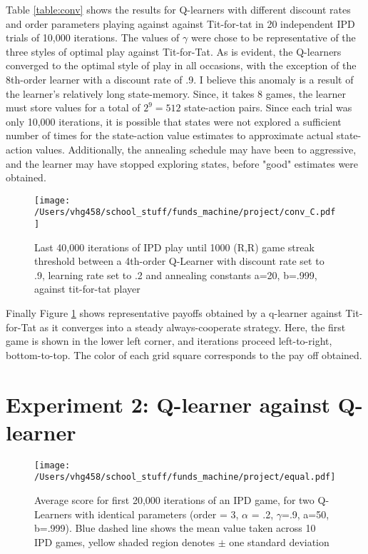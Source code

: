 \documentclass[12pt]{amsart}
\newcommand{\0}{\mat{0}}
\newcommand{\1}{\mathds{1}}
\begin{document}
Table \ref{table:conv} shows the results for Q-learners with different discount rates and order parameters playing against against Tit-for-tat in 20 independent IPD trials of 10,000 iterations.  The values of $\gamma$ were chose to be representative of the three styles of optimal play against Tit-for-Tat.  As is evident, the Q-learners converged to the optimal style of play in all occasions, with the exception of the 8th-order learner with a discount rate of .9.  I believe this anomaly is a result of the learner's relatively long state-memory.  Since, it takes 8 games, the learner must store values for a total of $2^9 = 512$ state-action pairs.  Since each trial was only 10,000 iterations, it is possible that states were not explored a sufficient number of times for the state-action value estimates to approximate actual state-action values.  Additionally, the annealing schedule may have been to aggressive, and the learner may have stopped exploring states, before "good" estimates were obtained.

  \begin{figure}
    \texttt{[image: /Users/vhg458/school\_stuff/funds\_machine/project/conv\_C.pdf]}
      \centering
        \caption{Last 40,000 iterations of IPD play until 1000 (R,R) game streak threshold between a 4th-order Q-Learner with discount rate set to .9, learning rate set to .2 and annealing constants a=20, b=.999, against tit-for-tat player  
}
  	\label{fig:heat_conv}
    \end{figure}

Finally Figure \ref{fig:heat_conv} shows representative payoffs obtained by a q-learner against Tit-for-Tat as it converges into a steady always-cooperate strategy.  Here, the first game is shown in the lower left corner, and iterations proceed left-to-right, bottom-to-top.  The color of each grid square corresponds to the pay off obtained. 
    
\section{Experiment 2: Q-learner against Q-learner}

 \begin{figure}
    \texttt{[image: /Users/vhg458/school\_stuff/funds\_machine/project/equal.pdf]}
      \centering
        \caption{Average score for first 20,000 iterations of an IPD game, for two Q-Learners with identical parameters (order = 3, $\alpha$ = .2, $\gamma$=.9, a=50, b=.999).  Blue dashed line shows the mean value taken across 10 IPD games, yellow shaded region denotes $\pm$ one standard deviation}
  	\label{fig:equal}
    \end{figure}
    
\end{document}
